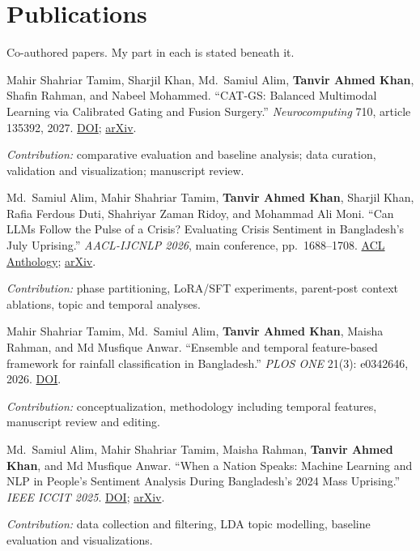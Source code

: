 \documentclass[a4paper,11pt]{article}
\newcommand{\pubStart}{%
\begin{enumerate}[label={[\arabic*]},leftmargin=2.1em,labelsep=0.5em,itemsep=4.5pt,
                  topsep=2pt,parsep=0pt,partopsep=0pt]\setlength{\emergencystretch}{5em}}
\newcommand{\pubEnd}{\end{enumerate}}
\begin{document}
\section{Publications}
{\small Co-authored papers. My part in each is stated beneath it.\par}
\pubStart
\item Mahir Shahriar Tamim, Sharjil Khan, Md.~Samiul Alim,
\textbf{Tanvir Ahmed Khan}, Shafin Rahman, and Nabeel Mohammed.
``CAT-GS: Balanced Multimodal Learning via Calibrated Gating and Fusion Surgery.''
\textit{Neurocomputing} 710, article 135392, 2027.
\href{https://doi.org/10.1016/j.neucom.2026.135392}{DOI};
\href{https://arxiv.org/abs/2608.24947}{arXiv}.\par
{\small\textit{Contribution:} comparative evaluation and baseline analysis; data curation,
validation and visualization; manuscript review.}
\item Md.~Samiul Alim, Mahir Shahriar Tamim, \textbf{Tanvir Ahmed Khan}, Sharjil Khan,
Rafia Ferdous Duti, Shahriyar Zaman Ridoy, and Mohammad Ali Moni.
``Can LLMs Follow the Pulse of a Crisis? Evaluating Crisis Sentiment in Bangladesh's July
Uprising.'' \textit{AACL-IJCNLP 2026}, main conference, pp.~1688--1708.
\href{https://aclanthology.org/2026.aacl-long.77/}{ACL Anthology};
\href{https://arxiv.org/abs/2609.16997}{arXiv}.\par
{\small\textit{Contribution:} phase partitioning, LoRA/SFT experiments, parent-post context
ablations, topic and temporal analyses.}
\item Mahir Shahriar Tamim, Md.~Samiul Alim, \textbf{Tanvir Ahmed Khan},
Maisha Rahman, and Md Musfique Anwar.
``Ensemble and temporal feature-based framework for rainfall classification in Bangladesh.''
\textit{PLOS ONE} 21(3): e0342646, 2026.
\href{https://doi.org/10.1371/journal.pone.0342646}{DOI}.\par
{\small\textit{Contribution:} conceptualization, methodology including temporal features,
manuscript review and editing.}
\item Md.~Samiul Alim, Mahir Shahriar Tamim, Maisha Rahman,
\textbf{Tanvir Ahmed Khan}, and Md Musfique Anwar.
``When a Nation Speaks: Machine Learning and NLP in People's Sentiment Analysis During
Bangladesh's 2024 Mass Uprising.'' \textit{IEEE ICCIT 2025}.
\href{https://doi.org/10.1109/ICCIT68739.2025.11491343}{DOI};
\href{https://arxiv.org/abs/2512.15547}{arXiv}.\par
{\small\textit{Contribution:} data collection and filtering, LDA topic modelling, baseline
evaluation and visualizations.}
\pubEnd
\end{document}
